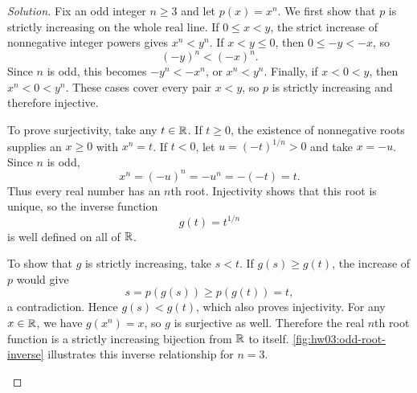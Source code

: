 \begin{proof}[Solution]
  Fix an odd integer $n\geq3$ and let $p(x)=x^n$. We first show that
  $p$ is strictly increasing on the whole real line. If $0\leq x<y$,
  the strict increase of nonnegative integer powers gives $x^n<y^n$.
  If $x<y\leq0$, then $0\leq-y<-x$, so
  \[
    (-y)^n<(-x)^n.
  \]
  Since $n$ is odd, this becomes $-y^n<-x^n$, or $x^n<y^n$.
  Finally, if $x<0<y$, then $x^n<0<y^n$. These cases cover every
  pair $x<y$, so $p$ is strictly increasing and therefore injective.

  To prove surjectivity, take any $t\in\mathbb{R}$. If $t\geq0$, the
  existence of nonnegative roots supplies an $x\geq0$ with $x^n=t$.
  If $t<0$, let $u=(-t)^{1/n}>0$ and take $x=-u$. Since $n$ is odd,
  \[
    x^n=(-u)^n=-u^n=-(-t)=t.
  \]
  Thus every real number has an $n$th root. Injectivity shows that
  this root is unique, so the inverse function
  \[
    g(t)=t^{1/n}
  \]
  is well defined on all of $\mathbb{R}$.

  To show that $g$ is strictly increasing, take $s<t$. If
  $g(s)\geq g(t)$, the increase of $p$ would give
  \[
    s=p(g(s))\geq p(g(t))=t,
  \]
  a contradiction. Hence $g(s)<g(t)$, which also proves injectivity.
  For any $x\in\mathbb{R}$, we have $g(x^n)=x$, so $g$ is surjective as
  well. Therefore the real $n$th root function is a strictly
  increasing bijection from $\mathbb{R}$ to itself.
  \autoref{fig:hw03:odd-root-inverse} illustrates this inverse
  relationship for $n=3$.
  \begin{marginfigure}
    \centering
    
    \caption[The cubic and its inverse.]{The graphs of $y=x^3$ and $y=x^{1/3}$ are reflections
      of one another across $y=x$. Both are strictly increasing.}
    \label{fig:hw03:odd-root-inverse}
  \end{marginfigure}
\end{proof}
